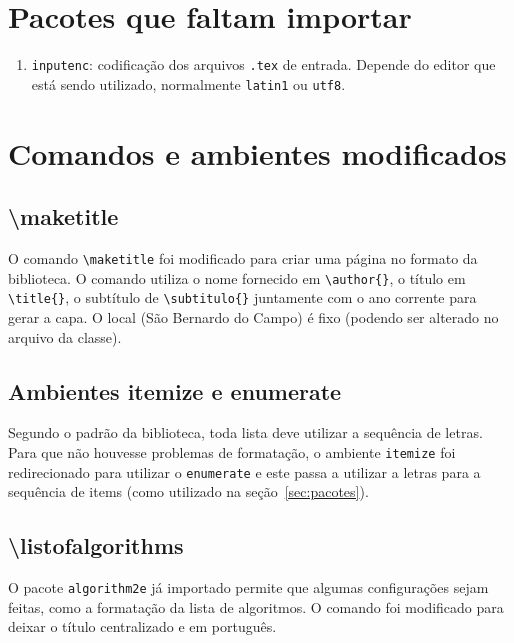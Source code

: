\documentclass{fei}
\begin{document}
\section{Pacotes que faltam importar}

    \begin{enumerate}
        \item\texttt{inputenc}: codificação dos arquivos \texttt{.tex} de entrada. Depende do editor que está sendo utilizado, normalmente \texttt{latin1} ou \texttt{utf8}.
    \end{enumerate}

\section{Comandos e ambientes modificados}
    
    \subsection{\textbackslash maketitle}
    
    O comando \verb+\maketitle+ foi modificado para criar uma página no formato da biblioteca. O comando utiliza o nome fornecido em \verb+\author{}+, o título em \verb+\title{}+, o subtítulo de \verb+\subtitulo{}+ juntamente com o ano corrente para gerar a capa. O local (São Bernardo do Campo) é fixo (podendo ser alterado no arquivo da classe).

    \subsection{Ambientes itemize e enumerate}
    
    Segundo o padrão da biblioteca, toda lista deve utilizar a sequência de letras. Para que não houvesse problemas de formatação, o ambiente \texttt{itemize} foi redirecionado para utilizar o \texttt{enumerate} e este passa a utilizar a letras para a sequência de items (como utilizado na seção~\ref{sec:pacotes}).
    
    \subsection{\textbackslash listofalgorithms}
    
    O pacote \texttt{algorithm2e} já importado permite que algumas configurações sejam feitas, como a formatação da lista de algoritmos. O comando foi modificado para deixar o título centralizado e em português.
    
\end{document}
